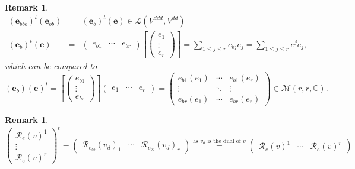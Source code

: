 \documentclass[aps,preprint]{revtex4}
\newtheorem{remark}[theorem]{Remark}
\begin{document}
\begin{remark}
\begin{eqnarray}
\left( \boldsymbol{e}_{bbb}\right) ^{t}\left( \boldsymbol{e}_{bb}\right)
&=&\left( \boldsymbol{e}_{b}\right) ^{t}\left( \boldsymbol{e}\right) \in 
\mathcal{L}\left( V^{ddd},V^{dd}\right) \\
\left( \boldsymbol{e}_{b}\right) ^{t}\left( \boldsymbol{e}\right) &=&\left( 
\begin{array}{ccc}
e_{b1} & \cdots & e_{br}%
\end{array}%
\right) \left[ \left( 
\begin{array}{c}
e_{1} \\ 
\vdots \\ 
e_{r}%
\end{array}%
\right) \right] =\sum_{1\leq j\leq r}e_{bj}e_{j}=\sum_{1\leq j\leq
r}e^{j}e_{j},
\end{eqnarray}%
which can be compared to 
\begin{equation}
\left( \boldsymbol{e}_{b}\right) \left( \boldsymbol{e}\right) ^{t}=\left[
\left( 
\begin{array}{c}
e_{b1} \\ 
\vdots \\ 
e_{br}%
\end{array}%
\right) \right] \left( 
\begin{array}{ccc}
e_{1} & \cdots & e_{r}%
\end{array}%
\right) =\left( 
\begin{array}{ccc}
e_{b1}\left( e_{1}\right) & \cdots & e_{b1}\left( e_{r}\right) \\ 
\vdots & \ddots & \vdots \\ 
e_{br}\left( e_{1}\right) & \cdots & e_{br}\left( e_{r}\right)%
\end{array}%
\right) \in \mathcal{M}\left( r,r,\mathbb{C}\right) .
\end{equation}
\end{remark}

\begin{remark}
\begin{equation}
\left( 
\begin{array}{c}
\mathcal{R}_{e}\left( v\right) ^{1} \\ 
\vdots \\ 
\mathcal{R}_{e}\left( v\right) ^{r}%
\end{array}%
\right) ^{t}=\left( 
\begin{array}{ccc}
\mathcal{R}_{e_{bb}}\left( v_{d}\right) _{1} & \cdots & \mathcal{R}%
_{e_{bb}}\left( v_{d}\right) _{r}%
\end{array}%
\right) \overset{\text{as }v_{d}\text{ is the dual of }v}{=}\left( 
\begin{array}{ccc}
\mathcal{R}_{e}\left( v\right) ^{1} & \cdots & \mathcal{R}_{e}\left(
v\right) ^{r}%
\end{array}%
\right)
\end{equation}
\end{remark}
\end{document}
